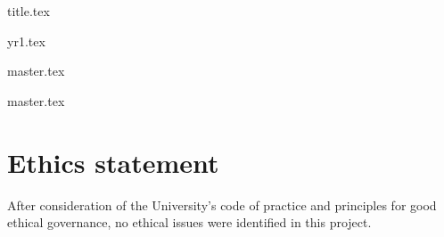 \documentclass[a4paper, 12pt]{article}
\begin{document}
{title.tex}





\setcounter{tocdepth}{4} %

\tableofcontents

\newpage




\newpage

\printglossary[type=acronym]

\newpage


{yr1.tex}

\newpage

{master.tex}

\newpage


{master.tex}





\newpage











\section{Ethics statement}

After consideration of the University's code of practice and principles for good ethical governance, no ethical issues were identified in this project. 


\newpage





\end{document}
